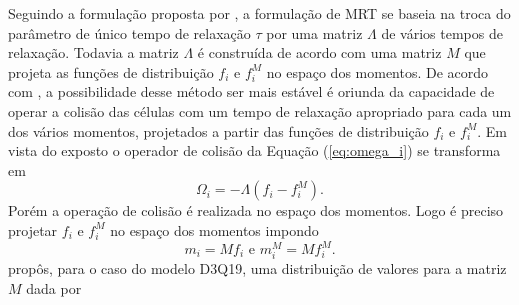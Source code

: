 Seguindo a formulação proposta por , a formulação de MRT se baseia na troca do parâmetro de único tempo de relaxação $\tau$ por uma matriz \textbf{$\Lambda$} de vários tempos de relaxação. Todavia a matriz \textbf{$\Lambda$} é construída de acordo com uma matriz \textbf{$M$} que projeta as funções de distribuição $f_{i}$ e $f_{i}^{M}$ no espaço dos momentos. De acordo com , a possibilidade desse método ser mais estável é oriunda da capacidade de operar a colisão das células com um tempo de relaxação apropriado para cada um dos vários momentos, projetados a partir das funções de distribuição $f_{i}$ e $f_{i}^{M}$. Em vista do exposto o operador de colisão da Equação (\ref{eq:omega_i}) se transforma em
\begin{equation}
	\Omega_{i} = -\textbf{$\Lambda$}(f_{i} - f_{i}^{M}).
    \label{eq:MRT_1}
\end{equation}
Porém a operação de colisão é realizada no espaço dos momentos. Logo é preciso projetar $f_{i}$ e $f_{i}^{M}$ no espaço dos momentos impondo
\begin{equation}
	m_{i} = \textbf{$M$}f_{i} \text{ e } m_{i}^{M} = \textbf{$M$}f_{i}^{M}.
    \label{eq:MRT_2}
\end{equation}
 propôs, para o caso do modelo D3Q19, uma distribuição de valores para a matriz \textbf{$M$} dada por


